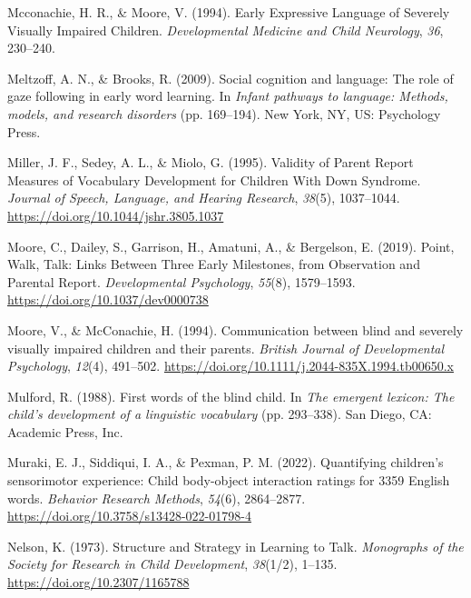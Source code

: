 \documentclass[
  man,floatsintext]{apa6}
\newlength{\cslhangindent}
\newlength{\cslentryspacingunit} %
\newenvironment{CSLReferences}[2] %
 {%
  \setlength{\parindent}{0pt}
  \ifodd #1
  \let\oldpar\par
  \def\par{\hangindent=\cslhangindent\oldpar}
  \fi
  \setlength{\parskip}{#2\cslentryspacingunit}
 }%
 {}
\begin{document}
\begin{CSLReferences}{1}{0}
\leavevmode{}%
Mcconachie, H. R., \& Moore, V. (1994). Early {Expressive Language} of {Severely Visually Impaired Children}. \emph{Developmental Medicine and Child Neurology}, \emph{36}, 230--240.

\leavevmode{}%
Meltzoff, A. N., \& Brooks, R. (2009). Social cognition and language: {The} role of gaze following in early word learning. In \emph{Infant pathways to language: {Methods}, models, and research disorders} (pp. 169--194). {New York, NY, US}: {Psychology Press}.

\leavevmode{}%
Miller, J. F., Sedey, A. L., \& Miolo, G. (1995). Validity of {Parent Report Measures} of {Vocabulary Development} for {Children With Down Syndrome}. \emph{Journal of Speech, Language, and Hearing Research}, \emph{38}(5), 1037--1044. \url{https://doi.org/10.1044/jshr.3805.1037}

\leavevmode{}%
Moore, C., Dailey, S., Garrison, H., Amatuni, A., \& Bergelson, E. (2019). Point, {Walk}, {Talk}: {Links Between Three Early Milestones}, from {Observation} and {Parental Report}. \emph{Developmental Psychology}, \emph{55}(8), 1579--1593. \url{https://doi.org/10.1037/dev0000738}

\leavevmode{}%
Moore, V., \& McConachie, H. (1994). Communication between blind and severely visually impaired children and their parents. \emph{British Journal of Developmental Psychology}, \emph{12}(4), 491--502. \url{https://doi.org/10.1111/j.2044-835X.1994.tb00650.x}

\leavevmode{}%
Mulford, R. (1988). First words of the blind child. In \emph{The emergent lexicon: {The} child's development of a linguistic vocabulary} (pp. 293--338). {San Diego, CA}: {Academic Press, Inc.}

\leavevmode{}%
Muraki, E. J., Siddiqui, I. A., \& Pexman, P. M. (2022). Quantifying children's sensorimotor experience: {Child} body-object interaction ratings for 3359 {English} words. \emph{Behavior Research Methods}, \emph{54}(6), 2864--2877. \url{https://doi.org/10.3758/s13428-022-01798-4}

\leavevmode{}%
Nelson, K. (1973). Structure and {Strategy} in {Learning} to {Talk}. \emph{Monographs of the Society for Research in Child Development}, \emph{38}(1/2), 1--135. \url{https://doi.org/10.2307/1165788}


\end{CSLReferences}
\end{document}
